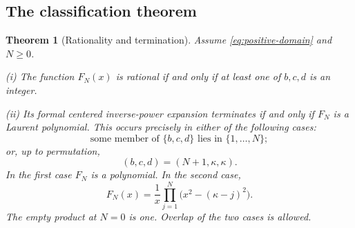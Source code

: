 \documentclass[11pt,a4paper]{article}
\numberwithin{equation}{section}
\newtheorem{theorem}{Theorem}[section]
\theoremstyle{definition}\newtheorem{definition}[theorem]{Definition}
\theoremstyle{remark}\newtheorem{remark}[theorem]{Remark}
\begin{document}
\subsection{The classification theorem}
\begin{theorem}[Rationality and termination]
\label{thm:classification}
Assume \eqref{eq:positive-domain} and $N\ge0$.

\textup{(i)} The function $F_N(x)$ is rational if and only if at least
one of $b,c,d$ is an integer.

\textup{(ii)} Its formal centered inverse-power expansion terminates
if and only if $F_N$ is a Laurent polynomial. This occurs precisely
in either of the following cases:
\begin{equation}
 \text{some member of }\{b,c,d\}\text{ lies in }\{1,\ldots,N\};
 \label{eq:short-integer}
\end{equation}
or, up to permutation,
\begin{equation}
 (b,c,d)=(N+1,\kappa,\kappa).
 \label{eq:exceptional}
\end{equation}
In the first case $F_N$ is a polynomial. In the second case,
\begin{equation}
 F_N(x)=\frac1x\prod_{j=1}^{N}\bigl(x^2-(\kappa-j)^2\bigr).
 \label{eq:exceptional-product}
\end{equation}
The empty product at $N=0$ is one. Overlap of the two cases is allowed.
\end{theorem}
\end{document}
